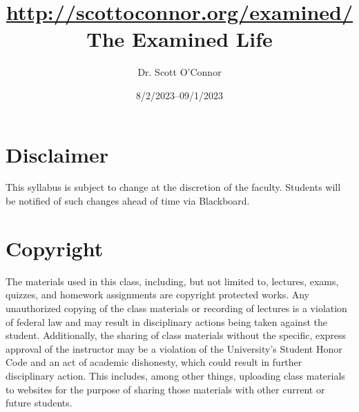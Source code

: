 \documentclass[article,oneside]{memoir}
\def\myauthor{Author}
\def\mytitle{Title}
\def\mycopyright{\myauthor}
\def\myweb{\href{http://scottoconnor.org/examined/}{http://scottoconnor.org/examined/}}
\def\myauthor{Dr. Scott O'Connor}
\def\mytitle{{\normalsize \myweb \newline} \HUGE The Examined Life}
\begin{document}
\setsansfont[Mapping=tex-text]{Myriad Pro} 
\setmonofont[Mapping=tex-text,Scale=0.8]{Georgia} 

\def\ind{\hangindent=1 true cm\hangafter=1 \noindent}
\def\labelitemi{$\cdot$}


\title{\LARGE \mytitle}     
\author{\Large\myauthor %
}
\date{8/2/2023--09/1/2023}


\maketitle




%
%

\section{Disclaimer}
 This syllabus is subject to change at the discretion of the faculty. Students will be notified of such changes ahead of time via Blackboard. 


\section{Copyright}
The materials used in this class, including, but not limited to, lectures, exams, quizzes, and homework assignments are copyright protected works.  Any unauthorized copying of the class materials or recording of lectures is a violation of federal law and may result in disciplinary actions being taken against the student.  Additionally, the sharing of class materials without the specific, express approval of the instructor may be a violation of the University's Student Honor Code and an act of academic dishonesty, which could result in further disciplinary action.  This includes, among other things, uploading class materials to websites for the purpose of sharing those materials with other current or future students. 
\end{document}
